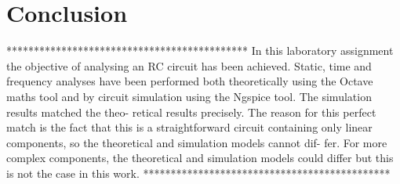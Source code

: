 \section{Conclusion}
\label{sec:conclusion}

********************************************
In this laboratory assignment the objective of analysing an RC circuit has been achieved. Static,
time and frequency analyses have been performed both theoretically using the Octave maths
tool and by circuit simulation using the Ngspice tool. The simulation results matched the theo-
retical results precisely. The reason for this perfect match is the fact that this is a straightforward
circuit containing only linear components, so the theoretical and simulation models cannot dif-
fer. For more complex components, the theoretical and simulation models could differ but this
is not the case in this work.
*********************************************
